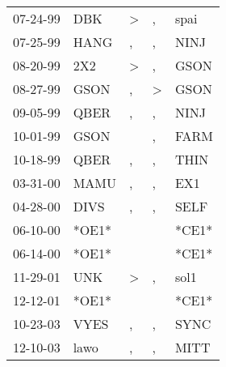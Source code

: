 \begin{supertabular}{p{0.07\textwidth}p{0.06\textwidth}p{0.02\textwidth}p{0.02\textwidth}p{0.06\textwidth}}
          07-24-99\textsuperscript{} &   DBK\textsuperscript{} &  \textgreater &             , &           spai\textsuperscript{} \\
          07-25-99\textsuperscript{} &  HANG\textsuperscript{} &             , &             , &           NINJ\textsuperscript{} \\
          08-20-99\textsuperscript{} &   2X2\textsuperscript{} &  \textgreater &             , &           GSON\textsuperscript{} \\
          08-27-99\textsuperscript{} &  GSON\textsuperscript{} &             , &  \textgreater &           GSON\textsuperscript{} \\
          09-05-99\textsuperscript{} &  QBER\textsuperscript{} &             , &             , &           NINJ\textsuperscript{} \\
          10-01-99\textsuperscript{} &  GSON\textsuperscript{} &               &             , &           FARM\textsuperscript{} \\
          10-18-99\textsuperscript{} &  QBER\textsuperscript{} &             , &             , &           THIN\textsuperscript{} \\
          03-31-00\textsuperscript{} &  MAMU\textsuperscript{} &             , &             , &            EX1\textsuperscript{} \\
          04-28-00\textsuperscript{} &  DIVS\textsuperscript{} &             , &             , &           SELF\textsuperscript{} \\
          06-10-00\textsuperscript{} &                   *OE1* &               &               &                            *CE1* \\
          06-14-00\textsuperscript{} &                   *OE1* &               &               &                            *CE1* \\
          11-29-01\textsuperscript{} &   UNK\textsuperscript{} &  \textgreater &             , &           sol1\textsuperscript{} \\
          12-12-01\textsuperscript{} &                   *OE1* &               &               &                            *CE1* \\
          10-23-03\textsuperscript{} &  VYES\textsuperscript{} &             , &             , &           SYNC\textsuperscript{} \\
          12-10-03\textsuperscript{} &  lawo\textsuperscript{} &             , &             , &           MITT\textsuperscript{} \\

\end{supertabular}
